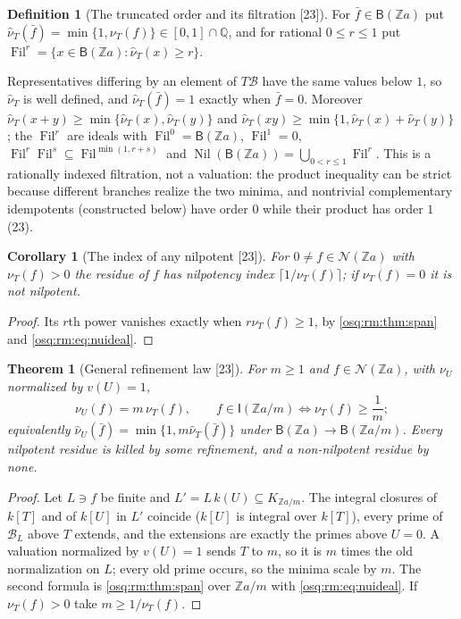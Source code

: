 \documentclass[11pt,letterpaper]{article}
\numberwithin{equation}{section}
\newtheorem{theorem}{Theorem}[section]
\newtheorem{corollary}[corollary]{Corollary}
\theoremstyle{definition}
\newtheorem{definition}[definition]{Definition}
\theoremstyle{remark}
\theoremstyle{plain}
\newcommand{\Z}{\mathbb Z}
\newcommand{\Q}{\mathbb Q}
\newcommand{\NN}{\mathcal N}         %
\newcommand{\src}[1]{\textup{\textsf{[#1]}}}
\begin{document}
\begin{definition}[The truncated order and its filtration \src{23}]\label{osq:rm:def:truncated}
For $\bar f\in\mathsf B(\Z a)$ put $\hat\nu_T(\bar f)=\min\{1,\nu_T(f)\}\in[0,1]\cap\Q$, and for rational $0\le r\le1$ put
$\operatorname{Fil}^r=\{x\in\mathsf B(\Z a):\hat\nu_T(x)\ge r\}$.
\end{definition}

Representatives differing by an element of $T\mathscr B$ have the same values below $1$, so $\hat\nu_T$ is well defined, and $\hat\nu_T(\bar f)=1$ exactly
when $\bar f=0$. Moreover $\hat\nu_T(x+y)\ge\min\{\hat\nu_T(x),\hat\nu_T(y)\}$ and $\hat\nu_T(xy)\ge\min\{1,\hat\nu_T(x)+\hat\nu_T(y)\}$; the $\operatorname{Fil}^r$ are
ideals with $\operatorname{Fil}^0=\mathsf B(\Z a)$, $\operatorname{Fil}^1=0$, $\operatorname{Fil}^r\operatorname{Fil}^s\subseteq\operatorname{Fil}^{\min(1,r+s)}$ and
$\operatorname{Nil}(\mathsf B(\Z a))=\bigcup_{0<r\le1}\operatorname{Fil}^r$. This is a rationally indexed filtration, not a valuation: the product inequality can
be strict because different branches realize the two minima, and nontrivial complementary idempotents (constructed below) have order $0$ while their
product has order $1$ (23).

\begin{corollary}[The index of any nilpotent \src{23}]\label{osq:rm:cor:generalindex}
For $0\ne f\in\NN(\Z a)$ with $\nu_T(f)>0$ the residue of $f$ has nilpotency index $\lceil1/\nu_T(f)\rceil$; if $\nu_T(f)=0$ it is not nilpotent.
\end{corollary}
\begin{proof}
Its $r$th power vanishes exactly when $r\nu_T(f)\ge1$, by \cref{osq:rm:thm:span} and \eqref{osq:rm:eq:nuideal}.
\end{proof}

\begin{theorem}[General refinement law \src{23}]\label{osq:rm:thm:generalrefinement}
For $m\ge1$ and $f\in\NN(\Z a)$, with $\nu_U$ normalized by $v(U)=1$,
\begin{equation}\label{osq:rm:eq:generalrefine}
 \nu_U(f)=m\,\nu_T(f),\qquad f\in\mathsf I(\Z a/m)\iff\nu_T(f)\ge\frac1m ;
\end{equation}
equivalently $\hat\nu_U(\bar f)=\min\{1,m\hat\nu_T(\bar f)\}$ under $\mathsf B(\Z a)\to\mathsf B(\Z a/m)$. Every nilpotent residue is killed by some refinement, and
a non-nilpotent residue by none.
\end{theorem}
\begin{proof}
Let $L\ni f$ be finite and $L'=L\,k(U)\subseteq K_{\Z a/m}$. The integral closures of $k[T]$ and of $k[U]$ in $L'$ coincide ($k[U]$ is integral over $k[T]$),
every prime of $\mathscr B_L$ above $T$ extends, and the extensions are exactly the primes above $U=0$. A valuation normalized by $v(U)=1$ sends $T$ to $m$,
so it is $m$ times the old normalization on $L$; every old prime occurs, so the minima scale by $m$. The second formula is \cref{osq:rm:thm:span} over
$\Z a/m$ with \eqref{osq:rm:eq:nuideal}. If $\nu_T(f)>0$ take $m\ge1/\nu_T(f)$.
\end{proof}
\end{document}
